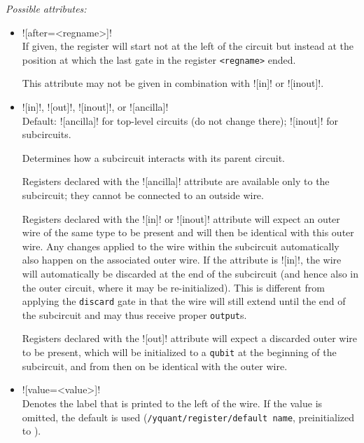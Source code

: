 \documentclass{scrartcl}
\def\ttlink{\link\texttt}
\def\texlink{\link\tex}
\begin{document}
         \emph{Possible attributes:}
         \begin{itemize}
            \item \linkdef{[after]}\yquant![after=<regname>]! \\
               If given, the register will start not at the left of the circuit but instead at the position at which the last gate in the register \texttt{<regname>} ended.

               This attribute may not be given in combination with \yquant![in]! or \yquant![inout]!.
            \item \linkdef{[in]}\linkdef{[out]}\linkdef{[inout]}\linkdef{[ancilla]}\yquant![in]!, \yquant![out]!, \yquant![inout]!, or \yquant![ancilla]! \\
               Default: \yquant![ancilla]! for top\hyp level circuits (do not change there); \yquant![inout]! for subcircuits.

               Determines how a subcircuit interacts with its parent circuit.

               Registers declared with the \yquant![ancilla]! attribute are available only to the subcircuit; they cannot be connected to an outside wire.

               Registers declared with the \yquant![in]! or \yquant![inout]! attribute will expect an outer wire of the same type to be present and will then be identical with this outer wire.
               Any changes applied to the wire within the subcircuit automatically also happen on the associated outer wire.
               If the attribute is \yquant![in]!, the wire will automatically be discarded at the end of the subcircuit (and hence also in the outer circuit, where it may be re\hyp initialized).
               This is different from applying the \ttlink{discard} gate in that the wire will still extend until the end of the subcircuit and may thus receive proper \ttlink{output}s.

               Registers declared with the \yquant![out]! attribute will expect a discarded outer wire to be present, which will be initialized to a \texttt{qubit} at the beginning of the subcircuit, and from then on be identical with the outer wire.
            \item \yquant![value=<value>]! \\
               Denotes the label that is printed to the left of the wire.
               If the value is omitted, the default is used (\ttlink{/yquant/register/default name}, preinitialized to \texlink\regidx).


\end{itemize}
\end{document}
